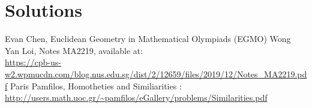 \documentclass[11pt,twoside]{scrartcl}
\begin{document}
\clearpage
\section{Solutions}
\makehints

\clearpage

\begin{thebibliography}{99}
	 Evan Chen, Euclidean Geometry in Mathematical Olympiads (EGMO)
     Wong Yan Loi, Notes MA2219, available at: \\ \url{https://cpb-us-w2.wpmucdn.com/blog.nus.edu.sg/dist/2/12659/files/2019/12/Notes_MA2219.pdf} 
	 Paris Pamfilos, Homotheties and Similiarities : \\ \url{http://users.math.uoc.gr/~pamfilos/eGallery/problems/Similarities.pdf}
\end{thebibliography}
\end{document}
